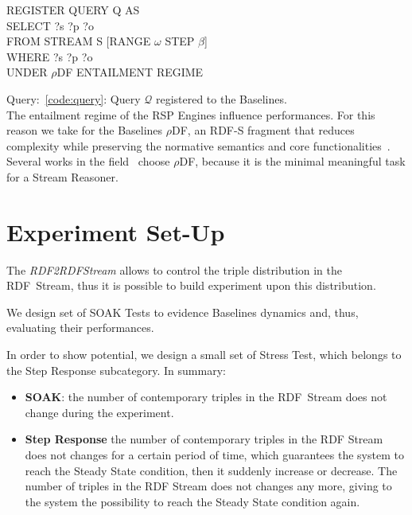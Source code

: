 \begin{center}
\raggedright
\small
REGISTER QUERY Q AS \\
SELECT ?s ?p ?o \\
FROM STREAM S [RANGE $\omega$ STEP $\beta$]\\
WHERE {?s ?p ?o}\\
UNDER $\rho$DF ENTAILMENT REGIME
\label{code:query}

\end{center}
Query:~\ref{code:query}: Query $\mathcal{Q}$ registered to the \name Baselines.\\

%

The entailment regime of the RSP Engines influence performances. For this reason we take for the Baselines $\rho$DF, an RDF-S fragment that reduces complexity while preserving the normative semantics and core functionalities~\cite{DBLP:conf/esws/MunozPG07}. Several works in the field~\cite{DBLP:conf/semweb/UrbaniMJHB13, Liu:2014:ERS:2567948.2577323} choose $\rho$DF, because it is the minimal meaningful task for a Stream Reasoner.

\section{Experiment Set-Up}\label{sec:experiment-setup}

The \textit{RDF2RDFStream} allows to control the triple distribution in the RDF~Stream, thus it is possible to build experiment upon this distribution. 

We design set of SOAK Tests to evidence Baselines dynamics and, thus, evaluating their performances. 

In order to show \name potential, we design a small set of Stress Test, which belongs to the Step Response subcategory. In summary:

\begin{itemize}
\item \textbf{SOAK}: the number of contemporary triples in the RDF~Stream does not change during the experiment.
\item \textbf{Step Response} the number of contemporary triples in the RDF Stream does not changes for a certain period of time, which guarantees the system to reach the Steady State condition, then it suddenly increase or decrease. The number of triples in the RDF Stream does not changes any more, giving to the system the possibility to reach the Steady State condition again.
\end{itemize}

